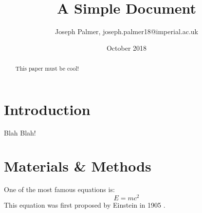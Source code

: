 \documentclass[12pt]{article}
\title{A Simple Document}
\author{Joseph Palmer, joseph.palmer18@imperial.ac.uk}
\date{October 2018}
\begin{document}
  \maketitle
  \begin{abstract}
    This paper must be cool!
  \end{abstract}

  \section{Introduction}
    Blah Blah!

  \section{Materials \& Methods}
  One of the most famous equations is:
  \begin{equation}
    E = mc^2
  \end{equation}
  This equation was first proposed by Einstein in 1905
  \cite{einstein1905does}.

  
  
\end{document}
